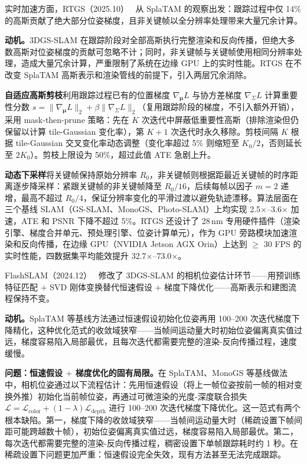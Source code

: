 实时加速方面，RTGS（2025.10）~\cite{2510_06644} 从 SplaTAM 的观察出发：跟踪过程中仅 14\% 的高斯贡献了绝大部分位姿梯度，且非关键帧以全分辨率处理带来大量冗余计算。

\textbf{动机。}3DGS-SLAM 在跟踪阶段对全部高斯执行完整渲染和反向传播，但绝大多数高斯对位姿梯度的贡献可忽略不计；同时，非关键帧与关键帧使用相同分辨率处理，造成大量冗余计算，严重限制了系统在边缘 GPU 上的实时性能。RTGS 在不改变 SplaTAM 高斯表示和渲染管线的前提下，引入两层冗余消除。

\textbf{自适应高斯剪枝}利用跟踪过程已有的位置梯度 $\nabla_{\boldsymbol{\mu}}L$ 与协方差梯度 $\nabla_{\Sigma}L$ 计算重要性分数 $s = \|\nabla_{\boldsymbol{\mu}}L\|_2 + \beta\|\nabla_{\Sigma}L\|_2$（复用跟踪阶段的梯度，不引入额外开销），采用 mask-then-prune 策略：先在 $K$ 次迭代中屏蔽低重要性高斯（排除渲染但仍保留以计算 tile-Gaussian 变化率），第 $K+1$ 次迭代时永久移除。剪枝间隔 $K$ 根据 tile-Gaussian 交叉变化率动态调整（变化率超过 5\% 则缩短至 $K_0/2$，否则延长至 $2K_0$）。剪枝上限设为 50\%，超过此值 ATE 急剧上升。

\textbf{动态下采样}将关键帧保持原始分辨率 $R_0$，非关键帧则根据距最近关键帧的时序距离逐步降采样：紧跟关键帧的非关键帧降至 $R_0/16$，后续每帧以因子 $m=2$ 递增，最高不超过 $R_0/4$，保证分辨率变化的平滑过渡以避免轨迹漂移。算法层面在三个基线 SLAM（GS-SLAM、MonoGS、Photo-SLAM）上均实现 2.5$\times$--3.6$\times$ 加速，ATE 和 PSNR 下降不超过 5\%。RTGS 还设计了 28\,nm 专用硬件插件（渲染引擎、梯度合并单元、预处理引擎、位姿计算单元），作为 GPU 旁路模块加速渲染和反向传播，在边缘 GPU（NVIDIA Jetson AGX Orin）上达到 $\geq$ 30 FPS 的实时性能，四数据集平均能效提升 32.7$\times$--73.0$\times$。

FlashSLAM（2024.12）~\cite{2412_00682} 修改了 3DGS-SLAM 的相机位姿估计环节——用预训练特征匹配 $+$ SVD 刚体变换替代恒速假设 $+$ 梯度下降优化——高斯表示和建图流程保持不变。

\textbf{动机。}SplaTAM 等基线方法通过恒速假设初始化位姿再用 100--200 次迭代梯度下降精化，这种优化范式的收敛域狭窄——当帧间运动量大时初始位姿偏离真实值过远，梯度容易陷入局部最优，且每次迭代都需要完整的渲染-反向传播过程，速度缓慢。

\textbf{问题：恒速假设 $+$ 梯度优化的固有局限。}在 SplaTAM、MonoGS 等基线做法中，相机位姿通过以下流程估计：先用恒速假设（将上一帧位姿按前一帧的相对变换外推）初始化当前帧位姿，再通过可微渲染的光度-深度联合损失 $\mathcal{L} = \mathcal{L}_\text{color} + (1-\lambda)\mathcal{L}_\text{depth}$ 进行 100--200 次迭代梯度下降优化。这一范式有两个根本缺陷。第一，梯度下降的收敛域狭窄——当帧间运动量大时（稀疏设置下帧间距可能跨越数十帧），初始位姿偏离真实值过远，梯度容易陷入局部最优。第二，每次迭代都需要完整的渲染-反向传播过程，稠密设置下单帧跟踪耗时约 1 秒。在稀疏设置下问题更加严重：恒速假设完全失效，现有方法甚至无法完成跟踪。

